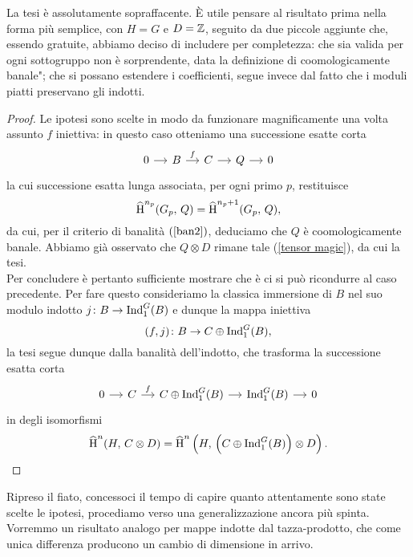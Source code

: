 La tesi è assolutamente sopraffacente. È utile pensare al risultato prima nella forma più semplice, con $ H=G $ e $ D = \mathbb{Z} $, seguito da due piccole aggiunte che, essendo gratuite, abbiamo deciso di includere per completezza: che sia valida per ogni sottogruppo non è sorprendente, data la definizione di \leftquote coomologicamente banale"; che si possano estendere i coefficienti, segue invece dal fatto che i moduli piatti preservano gli indotti. 

\begin{proof}
	Le ipotesi sono scelte in modo da funzionare magnificamente una volta assunto $ f $ iniettiva: in questo caso otteniamo una successione esatte corta
	\[ \begin{tikzcd}[column sep = small]
	0 \rar
	& B \rar["f"]
	& C \rar
	& Q \rar
	& 0 \end{tikzcd} \]
	la cui successione esatta lunga associata, per ogni primo $ p $, restituisce
	\[ \operatorname{\widehat{H}}^{n_p}(G_p, \, Q) = \operatorname{\widehat{H}}^{n_p+1}(G_p, \, Q), \]
	da cui, per il criterio di banalità $ (\ref{ban2}) $, deduciamo che $ Q $ è coomologicamente banale. Abbiamo già osservato che $ Q \otimes D $ rimane tale (\ref{tensor magic}), da cui la tesi. \\
	
	Per concludere è pertanto sufficiente mostrare che è ci si può ricondurre al caso precedente. Per fare questo consideriamo la classica immersione di $ B $ nel suo modulo indotto $ j \colon B \to \operatorname{Ind}_1^G(B) $ e dunque la mappa iniettiva
	\[ (f, j)\colon B \to C \oplus \operatorname{Ind}_1^G(B), \]
	la tesi segue dunque dalla banalità dell'indotto, che trasforma la successione esatta corta
	\[ \begin{tikzcd}[column sep = small]
	0 \rar
	& C \rar["f"]
	& C \oplus \Ind_1^G(B) \rar
	& \Ind_1^G(B) \rar
	& 0 \end{tikzcd} \]
	in degli isomorfismi
	\[ \operatorname{\widehat{H}}^n(H, \, C \otimes D ) = \operatorname{\widehat{H}}^n \left(H, \, \left(C \oplus \operatorname{Ind}_1^G(B)\right) \otimes D \right). \]
\end{proof}

Ripreso il fiato, concessoci il tempo di capire quanto attentamente sono state scelte le ipotesi, procediamo verso una generalizzazione ancora più spinta. Vorremmo un risultato analogo per mappe indotte dal tazza-prodotto, che come unica differenza producono un cambio di dimensione in arrivo.


